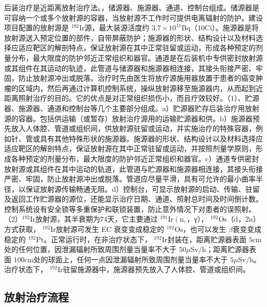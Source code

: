 后装治疗是近距离放射治疗法。，储源器、施源器、通道、控制台组成。储源器是可容纳一个或多个放射源的容器，当放射源不工作时可提供电离辐射的防护。建设项目配置的放射源是 $^ { 1 9 2 } \mathrm { I r }$源，最大装源活度约 $3.7 {\times} 10 ^ {11} \mathrm {Bq}$（10Ci）。施源器是将放射源送入预定位置的部件，自带屏蔽防护；施源器的形状、结构设计以及材料选择应适应靶区的解剖特点，保证放射源在其中正常驻留或运动，形成各种预定的剂量分布，最大限度的防护邻近正常组织和器官。通道是在后装机中专供密封放射源或其组件在其运动的轨迹，此管道与储源器和施源器相连接，其接头衔接严密、牢固，防止放射源冲出或脱落。治疗时先由医生将放疗源施用器放置于患者的癌变肿瘤的区域内，然后再通过计算机控制系统，操纵放射源移至施源器内，从而起到近距离照射治疗的目的。它的优点是对正常组织损伤小，而且疗效较好。（1）、贮源器、施源器、通道和控制台等几个主要部分组成。a）贮源器贮存后装治疗用放射源的容器。包括供运输（或暂存）放射治疗源用的运输贮源器和供。b）施源器预先放入人体腔、管道或组织间，供放射源驻留或运动，并实施治疗的特殊容器，例如针、管或具有其他特殊形状的施源器。施源器的形状、结构设计以及材料选择应适应靶区的解剖特点，保证放射源在其中正常驻留或运动，并按照剂量学原则，形成各种预定的剂量分布，最大限度的防护邻近正常组织和器官。c）通道专供密封放射源或其组件在其中运动的轨道，此管道与贮源器和施源器相连接，其接头衔接严密、牢固，防止放射源冲出或脱落。管道应尽量平滑，具有可允许的最小曲率半径，以保证放射源传输畅通无阻。d）控制台，可显示放射源的启动、传输、驻留及返回工作贮源器的源位，还能显示治疗日期、通道、照射总时间及时间倒计数。控制系统设有安全锁等多重保护和联锁装置，防止意外情况下对患者的误照射。（2） $^ { 1 9 2 } \mathrm { I r }$放射源，其半衰期为74天，它主要通过 $^ { 1 9 1 } \mathrm { I r } \left( \mathrm { n } , \right.$，γ）， $^ { 1 9 2 } \mathrm { O s }$（d，2n）方式获取， $^ { 1 9 2 } \mathrm { I r }$放射源可发生 EC 衰变变成稳定的 $^ { 1 9 2 } \mathrm { O s }$，也可以发生 $\beta$衰变变成稳定的 $^ { 1 9 2 } \mathrm { { P t } }$。正常运行时，在非治疗状态下， $^ { 1 9 2 } \mathrm { I r }$封装在，距离贮源器表面 $5 \mathrm { c m }$处的任何位置，因泄漏辐射所致周围剂量当量率不大于 $5 0 \mu \mathrm { S v / h }$；距离贮源器表面 $1 0 0 \mathrm { c m }$处的球面上，任何一点因泄漏辐射所致周围剂量当量率不大于 $5 \mu \mathrm { S v / h }$。治疗状态下， $^ { 1 9 2 } \mathrm { I r }$驻留施源器中，施源器预先放入了人体腔、管道或组织间。

\subsection{放射治疗流程}


